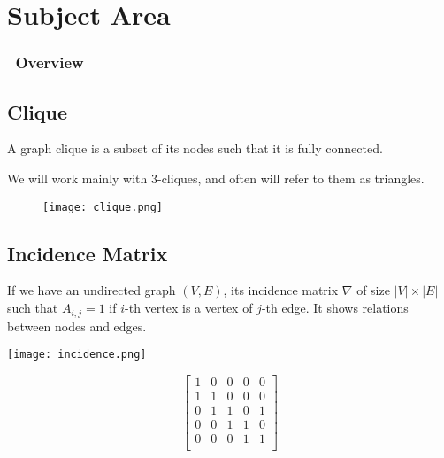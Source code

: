 \section{Subject Area}

\begin{frame}
	\frametitle{\secname\ Overview}
	\tableofcontents[currentsection]
\end{frame}

\subsection{Clique}
\begin{frame}{\subsecname}
	A graph clique is a subset of its nodes such that it is fully connected.

	We will work mainly with 3-cliques, and often will refer to them as triangles.

	\begin{figure}[H]
		\centering
		\texttt{[image: clique.png]}
	\end{figure}
\end{frame}

\subsection{Incidence Matrix}
\begin{frame}{\subsecname}
	If we have an undirected graph $(V, E)$, its incidence matrix $\nabla$ of size $\lvert V \rvert \times \lvert E \rvert$ such that $A_{i, j} = 1$ if $i$-th vertex is a vertex of $j$-th edge.
	It shows relations between nodes and edges.

	\begin{multicols}{2}
		\texttt{[image: incidence.png]}

		\[
			\begin{bmatrix}
				1 & 0 & 0 & 0 & 0 \\
				1 & 1 & 0 & 0 & 0 \\
				0 & 1 & 1 & 0 & 1 \\
				0 & 0 & 1 & 1 & 0 \\
				0 & 0 & 0 & 1 & 1 \\
			\end{bmatrix}
		\]

	\end{multicols}
\end{frame}

